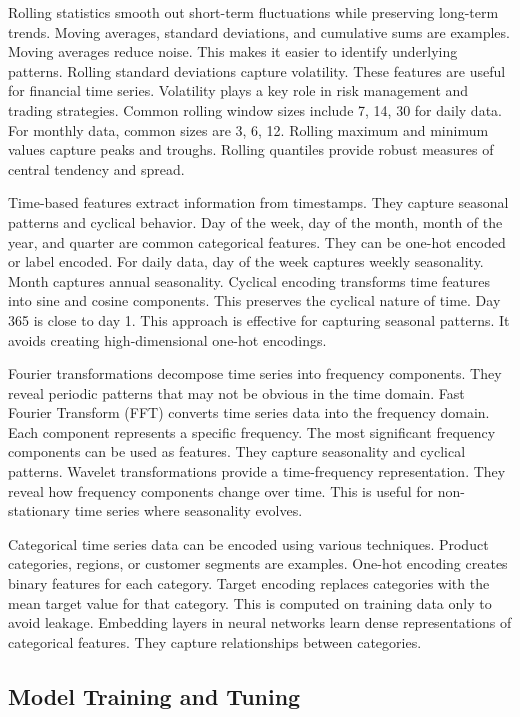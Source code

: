 Rolling statistics smooth out short-term fluctuations while preserving long-term trends. Moving averages, standard deviations, and cumulative sums are examples. Moving averages reduce noise. This makes it easier to identify underlying patterns. Rolling standard deviations capture volatility. These features are useful for financial time series. Volatility plays a key role in risk management and trading strategies. Common rolling window sizes include 7, 14, 30 for daily data. For monthly data, common sizes are 3, 6, 12. Rolling maximum and minimum values capture peaks and troughs. Rolling quantiles provide robust measures of central tendency and spread.

Time-based features extract information from timestamps. They capture seasonal patterns and cyclical behavior. Day of the week, day of the month, month of the year, and quarter are common categorical features. They can be one-hot encoded or label encoded. For daily data, day of the week captures weekly seasonality. Month captures annual seasonality. Cyclical encoding transforms time features into sine and cosine components. This preserves the cyclical nature of time. Day 365 is close to day 1. This approach is effective for capturing seasonal patterns. It avoids creating high-dimensional one-hot encodings.

Fourier transformations decompose time series into frequency components. They reveal periodic patterns that may not be obvious in the time domain. Fast Fourier Transform (FFT) converts time series data into the frequency domain. Each component represents a specific frequency. The most significant frequency components can be used as features. They capture seasonality and cyclical patterns. Wavelet transformations provide a time-frequency representation. They reveal how frequency components change over time. This is useful for non-stationary time series where seasonality evolves.

Categorical time series data can be encoded using various techniques. Product categories, regions, or customer segments are examples. One-hot encoding creates binary features for each category. Target encoding replaces categories with the mean target value for that category. This is computed on training data only to avoid leakage. Embedding layers in neural networks learn dense representations of categorical features. They capture relationships between categories.

\subsection{Model Training and Tuning}

